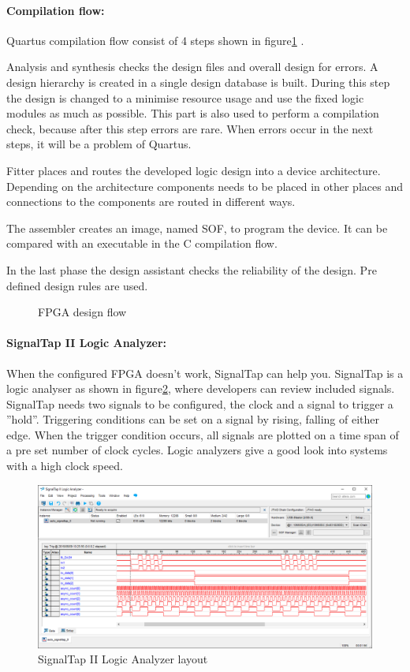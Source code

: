 \documentclass[12pt,a4paper,english,twoside,openright]{tutthesis}
\begin{document}
				\paragraph{Compilation flow:	}
Quartus compilation flow consist of 4 steps shown in figure\ref{fig:fpgaCompileFlow} \cite{QuartusCompilation}.

Analysis and synthesis checks the design files and overall design for errors. A design hierarchy is created in a single design database is built. During this step the design is changed to a minimise resource usage and use the fixed logic modules as much as possible. This part is also used to perform a compilation check, because after this step errors are rare. When errors occur in the next steps, it will be a problem of Quartus.

Fitter places and routes the developed logic design into a device architecture. Depending on the architecture components needs to be placed in other places and connections to the components are routed in different ways.

The assembler creates an image, named SOF, to program the device. It can be compared with an executable in the C compilation flow.

In the last phase the design assistant checks the reliability of the design. Pre defined design rules are used.
\begin{figure}\centering
	
	\caption{FPGA design flow}\label{fig:fpgaCompileFlow}
\end{figure}
				\paragraph{SignalTap II Logic Analyzer:	}
When the configured FPGA doesn't work, SignalTap can help you. SignalTap is a logic analyser as shown in figure\ref{fig:signalTap}, where developers can review included signals. SignalTap needs two signals to be configured, the clock and a signal to trigger a ''hold''. Triggering conditions can be set on a signal by rising, falling of either edge. When the trigger condition occurs, all signals are plotted on a time span of a pre set number of clock cycles. Logic analyzers give a good look into systems with a high clock speed.
\begin{figure}
	\centering
	\includegraphics[scale=0.42]{images/SignalTapLogicAnalyzer.png}
	\caption{SignalTap II Logic Analyzer layout}
	\label{fig:signalTap}
\end{figure}
\end{document}
